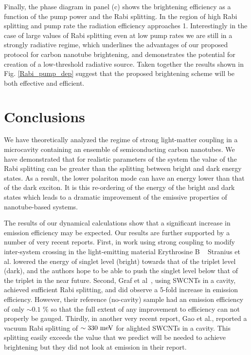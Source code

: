 \documentclass[journal=aamick,manuscript=article]{achemso}
\begin{document}
Finally, the phase diagram in panel (c) shows the brightening efficiency as a function of the pump power and the Rabi splitting. In the region of high Rabi splitting and pump rate the radiation efficiency approaches 1. Interestingly in the case of large values of Rabi splitting even at low pump rates we are still in a strongly radiative regime, which underlines the advantages of our proposed  protocol for carbon nanotube brightening, and demonstrates the potential for creation of a low-threshold radiative source. Taken together the results shown in Fig. \ref{Rabi_pump_dep} suggest that the proposed brightening scheme will be both effective and efficient.


\section*{Conclusions}
We have theoretically analyzed the regime of strong light-matter coupling in a microcavity containing an ensemble of semiconducting carbon nanotubes.
We have demonstrated that for realistic parameters of the system the value of the Rabi splitting can be greater than the splitting between bright and dark energy states.
As a result, the lower polariton mode can have an energy lower than that of the dark exciton.
It is this re-ordering of the energy of the bright and dark states which leads to a dramatic improvement of the emissive properties of nanotube-based systems.

The results of our dynamical calculations show that a significant increase in emission efficiency may be expected.
Our results are further supported by a number of very recent reports.
First, in work using strong coupling to modify inter-system crossing in the light-emitting material Erythrosine B ~\cite{Stranius2018} Stranius et al. lowered the energy of singlet level (bright) towards that of the triplet level (dark), and the authors hope to be able to push the singlet level below that of the triplet in the near future.
Second, Graf et al~\cite{Graf2017}, using SWCNTs in a cavity, achieved sufficient Rabi splitting, and did observe a 5-fold increase in emission efficiency. However, their reference (no-cavity) sample had an emission efficiency of only $\sim 0.1$ \% so that the full extent of any improvement to efficiency can not properly be gauged. Thirdly, in another very recent report, Gao et al., reported a vacuum Rabi splitting of $\sim330~\rm{meV}$ for alighted SWCNTs in a cavity\cite{Gao2018}. This splitting easily exceeds the value that we predict will be needed to achieve brightening but they did not look at emission in their report.
\end{document}
